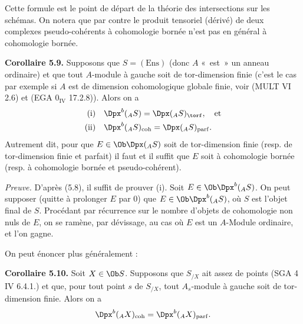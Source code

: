 Cette formule est le point de départ de la théorie des intersections sur les schémas. On notera que par contre le produit tensoriel (dérivé) de deux complexes pseudo-cohérents à cohomologie bornée n'est pas en général à cohomologie bornée.

\textbf{Corollaire 5.9.} Supposons que \(S=(\mathrm{Ens})\) (donc \(A\) «~est~» un anneau ordinaire) et que tout \(A\)-module à gauche soit de tor-dimension finie (c'est le cas par exemple si \(A\) est de dimension cohomologique globale finie, voir (MULT VI 2.6) et (EGA \(0_{\mathrm{IV}}\) 17.2.8)). Alors on a
\[
\begin{aligned}
\text{(i)}\quad & \Dpx^b({}_A S)=\Dpx({}_A S)_{\torf},\quad\text{et}\\
\text{(ii)}\quad & \Dpx^b({}_A S)_{\mathrm{coh}}=\Dpx({}_A S)_{\mathrm{parf}}.
\end{aligned}
\]
Autrement dit, pour que \(E\in\Ob\Dpx({}_A S)\) soit de tor-dimension finie (resp. de tor-dimension finie et parfait) il faut et il suffit que \(E\) soit à cohomologie bornée (resp. à cohomologie bornée et pseudo-cohérent).

\emph{Preuve.} D'après (5.8), il suffit de prouver (i). Soit \(E\in\Ob\Dpx^b({}_A S)\). On peut supposer (quitte à prolonger \(E\) par \(0\)) que \(E\in\Ob\Dpx^b({}_A S)\), où \(S\) est l'objet final de \(S\). Procédant par récurrence sur le nombre d'objets de cohomologie non nuls de \(E\), on se ramène, par dévissage, au cas où \(E\) est un \(A\)-Module ordinaire, et l'on gagne.

On peut énoncer plus généralement :

\textbf{Corollaire 5.10.} Soit \(X\in\Ob S\). Supposons que \(S_{/X}\) ait assez de points (SGA 4 IV 6.4.1.) et que, pour tout point \(s\) de \(S_{/X}\), tout \(A_s\)-module à gauche soit de tor-dimension finie. Alors on a
\[
  \Dpx^b({}_A X)_{\mathrm{coh}}=\Dpx^b({}_A X)_{\mathrm{parf}}.
\]
